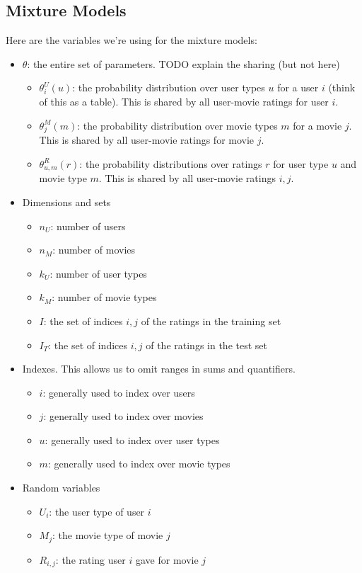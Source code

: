 \documentclass{article}
\begin{document}
\subsection{Mixture Models}
\label{sec:appendix-mixture}

Here are the variables we're using for the mixture models:

\begin{itemize}
\item $\theta$: the entire set of parameters. TODO explain the sharing
  (but not here)
  \begin{itemize}
  \item $\theta^U_i(u)$: the probability distribution over user types
    $u$ for a user $i$ (think
    of this as a table). This is shared by all user-movie ratings for
    user $i$.
  \item $\theta^M_j(m)$: the probability distribution over movie
    types $m$ for a movie $j$. This is shared by all user-movie ratings for movie $j$.
  \item $\theta^R_{u,m}(r)$: the probability distributions over
    ratings $r$ for user type $u$ and movie type $m$. This is shared
    by all user-movie ratings $i,j$.
  \end{itemize}
\item Dimensions and sets
  \begin{itemize}
  \item $n_U$: number of users
  \item $n_M$: number of movies
  \item $k_U$: number of user types
  \item $k_M$: number of movie types
  \item $I$: the set of indices $i,j$ of the ratings in the training
    set
  \item $I_T$: the set of indices $i,j$ of the ratings in the test set
  \end{itemize}
\item Indexes. This allows us to omit ranges in sums and quantifiers.
  \begin{itemize}
  \item $i$: generally used to index over users
  \item $j$: generally used to index over movies
  \item $u$: generally used to index over user types
  \item $m$: generally used to index over movie types
  \end{itemize}
\item Random variables
  \begin{itemize}
  \item $U_i$: the user type of user $i$
  \item $M_j$: the movie type of movie $j$
  \item $R_{i,j}$: the rating user $i$ gave for movie $j$
  \end{itemize}
\end{itemize}

\footnotesize


\end{document}
